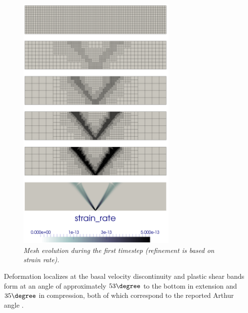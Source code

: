 \begin{figure}
   \centering
   \includegraphics[width=0.7\textwidth]{cookbooks/crustal_deformation/doc/grids.png}
   \caption{\it Mesh evolution during the first timestep (refinement is based on strain rate).}
   \label{fig:meshes}
\end{figure}



Deformation localizes at the basal velocity discontinuity and plastic shear bands
form at an angle of approximately $53\degree$ to the bottom in extension and
$35\degree$ in compression, both of which correspond to the reported Arthur angle \cite{kaus10,buit12}.

